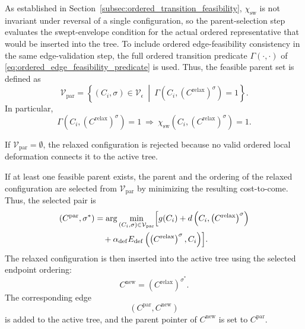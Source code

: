 \documentclass{pas}
\begin{document}
As established in Section~\ref{subsec:ordered_transition_feasibility},
\(\chi_{\mathrm{sw}}\) is not invariant under reversal of a single
configuration, so the parent-selection step evaluates the swept-envelope
condition for the actual ordered representative that would be inserted into the
tree. To include ordered edge-feasibility consistency in the same
edge-validation step, the full ordered transition predicate
\(\Gamma(\cdot,\cdot)\) of \eqref{eq:ordered_edge_feasibility_predicate} is
used. Thus, the feasible parent set is defined as
\begin{equation}
\mathcal{V}_{\mathrm{par}}
=
\left\{
\left(C_i,\sigma\right)\in \mathcal{V}_{\epsilon}
\ \middle|\
\Gamma
\left(
C_i,
\left(C^{\mathrm{relax}}\right)^{\sigma}
\right)
=
1
\right\}.
\label{eq:feasible_parent_set}
\end{equation}
In particular,
\begin{equation}
\Gamma
\left(
C_i,
\left(C^{\mathrm{relax}}\right)^{\sigma}
\right)
=
1
\
\Longrightarrow
\
\chi_{\mathrm{sw}}
\left(
C_i,
\left(C^{\mathrm{relax}}\right)^{\sigma}
\right)
=
1 .
\label{eq:gamma_implies_swept_clear_parent}
\end{equation}

If \(\mathcal{V}_{\mathrm{par}}=\emptyset\), the relaxed configuration is
rejected because no valid ordered local deformation connects it to the active
tree.

If at least one feasible parent exists, the parent and the ordering of the
relaxed configuration are selected from \(\mathcal{V}_{\mathrm{par}}\) by
minimizing the resulting cost-to-come. Thus, the selected pair is
\begin{equation}
\begin{aligned}
\left(
C^{\mathrm{par}},
\sigma^{\ast}
\right)
&=
\arg\min_{\left(C_i,\sigma\right)\in\mathcal{V}_{\mathrm{par}}}
\Bigl[
g(C_i)
+
d
\left(
C_i,
\left(C^{\mathrm{relax}}\right)^{\sigma}
\right)
\\
&\quad+
\alpha_{\mathrm{def}}
E_{\mathrm{def}}
\left(
\left(C^{\mathrm{relax}}\right)^{\sigma},
C_i
\right)
\Bigr].
\end{aligned}
\label{eq:selected_parent_cost}
\end{equation}
The relaxed configuration is then inserted into the active tree using the
selected endpoint ordering:
\begin{equation}
C^{\mathrm{new}}
=
\left(C^{\mathrm{relax}}\right)^{\sigma^{\ast}}.
\label{eq:new_node_is_relaxed}
\end{equation}
The corresponding edge
\begin{equation}
\left(
C^{\mathrm{par}},C^{\mathrm{new}}
\right)
\label{eq:new_tree_edge}
\end{equation}
is added to the active tree, and the parent pointer of \(C^{\mathrm{new}}\) is
set to \(C^{\mathrm{par}}\).
\end{document}

